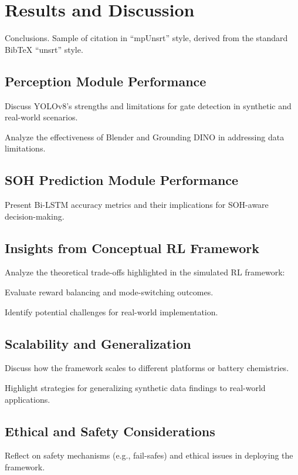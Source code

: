 \chapter{Results and Discussion}\label{ch:6}
\minitoc

Conclusions. Sample of citation in ``mpUnsrt'' style, derived from the standard {Bib\TeX} ``unsrt'' style.

\newpage

\section{Perception Module Performance}

Discuss YOLOv8's strengths and limitations for gate detection in synthetic and real-world scenarios.


Analyze the effectiveness of Blender and Grounding DINO in addressing data limitations.


\section{SOH Prediction Module Performance}

Present Bi-LSTM accuracy metrics and their implications for SOH-aware decision-making.


\section{Insights from Conceptual RL Framework}

Analyze the theoretical trade-offs highlighted in the simulated RL framework:

Evaluate reward balancing and mode-switching outcomes.

Identify potential challenges for real-world implementation.


\section{Scalability and Generalization}

Discuss how the framework scales to different platforms or battery chemistries.

Highlight strategies for generalizing synthetic data findings to real-world applications.


\section{Ethical and Safety Considerations}

Reflect on safety mechanisms (e.g., fail-safes) and ethical issues in deploying the framework.

\endinput